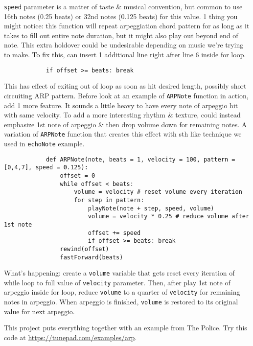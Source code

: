 \documentclass{article}
\begin{document}
\begin{itemize}
\begin{itemize}
		{\tt speed} parameter is a matter of taste \& musical convention, but common to use 16th notes (0.25 beats) or 32nd notes (0.125 beats) for this value. 1 thing you might notice: this function will repeat arpeggiation chord pattern for as long as it takes to fill out entire note duration, but it might also play out beyond end of note. This extra holdover could be undesirable depending on music we're trying to make. To fix this, can insert 1 additional line right after line 6 inside for loop.
		\begin{verbatim}
			if offset >= beats: break
		\end{verbatim}
		This has effect of exiting out of loop as soon as hit desired length, possibly short circuiting ARP pattern. Before look at an example of {\tt ARPNote} function in action, add 1 more feature. It sounds a little heavy to have every note of arpeggio hit with same velocity. To add a more interesting rhythm \& texture, could instead emphasize 1st note of arpeggio \& then drop volume down for remaining notes. A variation of {\tt ARPNote} function that creates this effect with sth like technique we used in {\tt echoNote} example.
		\begin{verbatim}
			def ARPNote(note, beats = 1, velocity = 100, pattern = [0,4,7], speed = 0.125):
			    offset = 0
			    while offset < beats:
			        volume = velocity # reset volume every iteration
			        for step in pattern:
			            playNote(note + step, speed, volume)
			            volume = velocity * 0.25 # reduce volume after 1st note
			            offset += speed
			            if offset >= beats: break
			    rewind(offset)
			    fastForward(beats)
		\end{verbatim}
		What's happening: create a {\tt volume} variable that gets reset every iteration of while loop to full value of {\tt velocity} parameter. Then, after play 1st note of arpeggio inside for loop, reduce {\tt volume} to a quarter of {\tt velocity} for remaining notes in arpeggio. When arpeggio is finished, {\tt volume} is restored to its original value for next arpeggio.
		
		This project puts everything together with an example from The Police. Try this code at \url{https://tunepad.com/examples/arp}.
		

\end{itemize}
\end{itemize}
\end{document}
